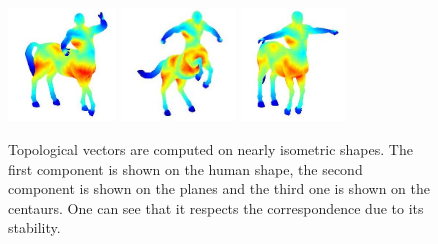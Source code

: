 \begin{figure}[t!]
\begin{center}
\includegraphics[height = 3cm]{figures/stab10}
\includegraphics[height = 3cm]{figures/stab11}
\includegraphics[height = 3cm]{figures/stab12}  
\caption[Stability of topological vectors]{\label{fig:preserv} Topological vectors are computed on
nearly isometric shapes. The first component is shown on the human shape,
the second component is shown on the planes and the third one is shown on the centaurs.
One can see that it respects the 
correspondence due to its stability.}
\end{center}
\end{figure} 






